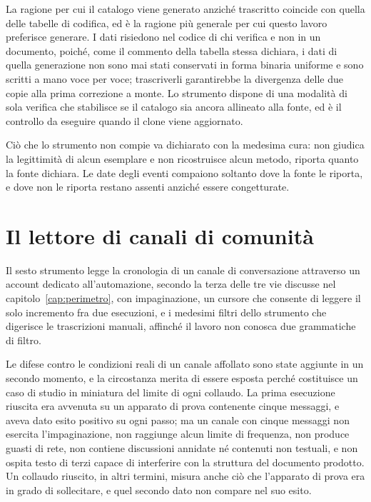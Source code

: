 La ragione per cui il catalogo viene generato anziché trascritto coincide con quella delle tabelle di codifica, ed è la ragione più generale per cui questo lavoro preferisce generare. I dati risiedono nel codice di chi verifica e non in un documento, poiché, come il commento della tabella stessa dichiara, i dati di quella generazione non sono mai stati conservati in forma binaria uniforme e sono scritti a mano voce per voce; trascriverli garantirebbe la divergenza delle due copie alla prima correzione a monte. Lo strumento dispone di una modalità di sola verifica che stabilisce se il catalogo sia ancora allineato alla fonte, ed è il controllo da eseguire quando il clone viene aggiornato.

Ciò che lo strumento non compie va dichiarato con la medesima cura: non giudica la legittimità di alcun esemplare e non ricostruisce alcun metodo, riporta quanto la fonte dichiara. Le date degli eventi compaiono soltanto dove la fonte le riporta, e dove non le riporta restano assenti anziché essere congetturate.

\section{Il lettore di canali di comunità}

Il sesto strumento legge la cronologia di un canale di conversazione attraverso un account dedicato all'automazione, secondo la terza delle tre vie discusse nel capitolo~\ref{cap:perimetro}, con impaginazione, un cursore che consente di leggere il solo incremento fra due esecuzioni, e i medesimi filtri dello strumento che digerisce le trascrizioni manuali, affinché il lavoro non conosca due grammatiche di filtro.

Le difese contro le condizioni reali di un canale affollato sono state aggiunte in un secondo momento, e la circostanza merita di essere esposta perché costituisce un caso di studio in miniatura del limite di ogni collaudo. La prima esecuzione riuscita era avvenuta su un apparato di prova contenente cinque messaggi, e aveva dato esito positivo su ogni passo; ma un canale con cinque messaggi non esercita l'impaginazione, non raggiunge alcun limite di frequenza, non produce guasti di rete, non contiene discussioni annidate né contenuti non testuali, e non ospita testo di terzi capace di interferire con la struttura del documento prodotto. Un collaudo riuscito, in altri termini, misura anche ciò che l'apparato di prova era in grado di sollecitare, e quel secondo dato non compare nel suo esito.

